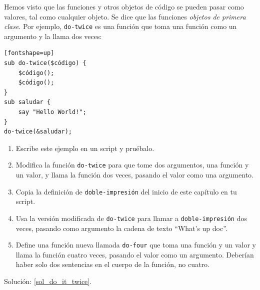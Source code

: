 \begin{exercise}
\label{do_it_twice}

Hemos visto que las funciones y otros objetos de código 
se pueden pasar como valores, tal como cualquier objeto. Se dice
que las funciones \emph{objetos de primera clase}. Por ejemplo, 
\verb|do-twice| es una función que toma una función como un
argumento y la llama dos veces:

\begin{verbatim}[fontshape=up]
sub do-twice($código) {
    $código(); 
    $código();
}
sub saludar {
    say "Hello World!";
}
do-twice(&saludar);
\end{verbatim}

\begin{enumerate}

\item Escribe este ejemplo en un script y 
pruébalo.

\item Modifica la función \verb|do-twice| para que tome
dos argumentos, una función y un valor, y llama la función
dos veces, pasando el valor como una argumento.

\item Copia la definición de \verb|doble-impresión| del 
inicio de este capítulo en tu script.

\item Usa la versión modificada de \verb|do-twice| para llamar
a \verb|doble-impresión| dos veces, pasando como argumento
la cadena de texto ``What's up doc''.

\item Define una función nueva llamada \verb|do-four|
que toma una función y un valor y llama la función
cuatro veces, pasando el valor como un argumento. Deberían
haber solo dos sentencias en el cuerpo de la función, no cuatro.

\end{enumerate}

Solución: \ref{sol_do_it_twice}.

\end{exercise}



